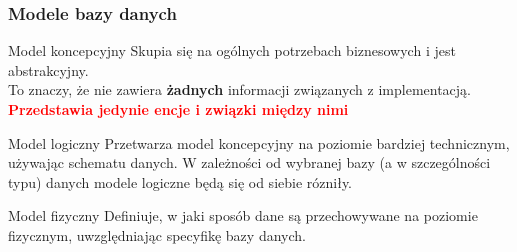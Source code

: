 \documentclass{beamer}
\begin{document}
\begin{frame}
    \frametitle{Modele bazy danych}
    \begin{block}{Model koncepcyjny}
        Skupia się na ogólnych potrzebach biznesowych i jest abstrakcyjny. \\
        To znaczy, że nie zawiera \textbf{żadnych} informacji związanych z implementacją. \\ 
        \textbf{\textcolor{red}{Przedstawia jedynie encje i związki między nimi}}
    \end{block}
    \begin{block}{Model logiczny}
        Przetwarza model koncepcyjny na poziomie bardziej technicznym, używając schematu danych.
        W zależności od wybranej bazy (a w szczególności typu) danych modele logiczne będą się od siebie rózniły.
    \end{block} 
    \begin{block}{Model fizyczny}
        Definiuje, w jaki sposób dane są przechowywane na poziomie fizycznym, uwzględniając specyfikę bazy danych.
    \end{block}
\end{frame}
\end{document}
